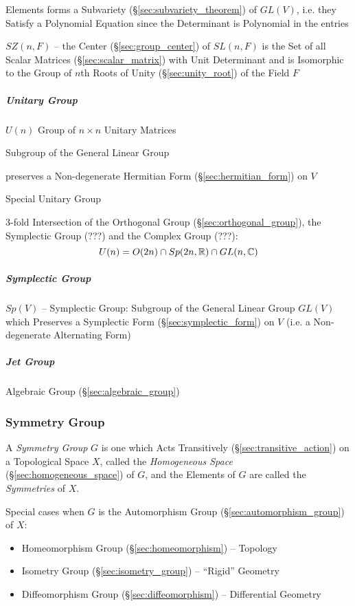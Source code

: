Elements forms a Subvariety (\S\ref{sec:subvariety_theorem}) of $GL(V)$, i.e.
they Satisfy a Polynomial Equation since the Determinant is Polynomial in the
entries

$SZ(n,F)$ -- the Center (\S\ref{sec:group_center}) of $SL(n,F)$ is the Set of
all Scalar Matrices (\S\ref{sec:scalar_matrix}) with Unit Determinant and is
Isomorphic to the Group of $n$th Roots of Unity (\S\ref{sec:unity_root}) of the
Field $F$



\subparagraph{Unitary Group}\label{sec:unitary_group}\hfill

$U(n)$ Group of $n \times n$ Unitary Matrices

Subgroup of the General Linear Group

preserves a Non-degenerate Hermitian Form (\S\ref{sec:hermitian_form}) on $V$

Special Unitary Group

3-fold Intersection of the Orthogonal Group (\S\ref{sec:orthogonal_group}), the
Symplectic Group (???) and the Complex Group (???): %
\[
  U(n) = O(2n) \cap Sp(2n,\mathbb{R}) \cap GL(n,\mathbb{C})
\]



\subparagraph{Symplectic Group}\label{sec:symplectic_group}\hfill

$Sp(V)$ -- Symplectic Group: Subgroup of the General Linear Group $GL(V)$ which
Preserves a Symplectic Form (\S\ref{sec:symplectic_form}) on $V$ (i.e. a
Non-degenerate Alternating Form)



\subparagraph{Jet Group}\label{sec:jet_group}\hfill

Algebraic Group (\S\ref{sec:algebraic_group})



\subsubsection{Symmetry Group}\label{sec:symmetry_group}

A \emph{Symmetry Group} $G$ is one which Acts Transitively
(\S\ref{sec:transitive_action}) on a Topological Space $X$, called the
\emph{Homogeneous Space} (\S\ref{sec:homogeneous_space}) of $G$, and the Elements
of $G$ are called the \emph{Symmetries} of $X$.

Special cases when $G$ is the Automorphism Group
(\S\ref{sec:automorphism_group}) of $X$:
\begin{itemize}
  \item Homeomorphism Group (\S\ref{sec:homeomorphism}) -- Topology
  \item Isometry Group (\S\ref{sec:isometry_group}) -- ``Rigid'' Geometry
  \item Diffeomorphism Group (\S\ref{sec:diffeomorphism}) -- Differential
    Geometry
\end{itemize}


